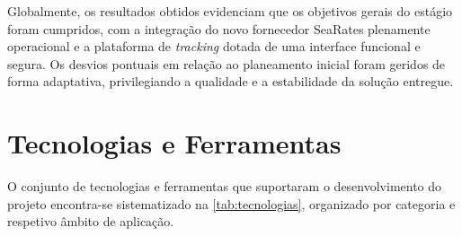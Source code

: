 \documentclass[a4paper,12pt]{report}
\begin{document}
Globalmente, os resultados obtidos evidenciam que os objetivos gerais do estágio foram cumpridos, com a integração do novo fornecedor SeaRates plenamente operacional e a plataforma de \textit{tracking} dotada de uma interface funcional e segura. Os desvios pontuais em relação ao planeamento inicial foram geridos de forma adaptativa, privilegiando a qualidade e a estabilidade da solução entregue.

\section{Tecnologias e Ferramentas}

O conjunto de tecnologias e ferramentas que suportaram o desenvolvimento do projeto encontra-se sistematizado na \autoref{tab:tecnologias}, organizado por categoria e respetivo âmbito de aplicação.
\end{document}
